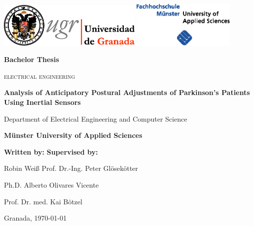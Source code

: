 \begin{titlepage}
\label{ch:titlepage}
\begin{center}

\includegraphics[width=7cm]{images/universidad_de_granada.eps}
	\hfill
\includegraphics[width=5cm]{images/fh-muenster.eps}
	\\ 

\vspace{3cm}

\Large\textbf{Bachelor Thesis}

\large\textsc{electrical engineering}

\vspace{1cm}

{\huge\textbf{Analysis of Anticipatory Postural Adjustments of Parkinson's Patients Using Inertial Sensors}}

\vspace{1cm}

Department of Electrical Engineering and Computer Science

\textbf{Münster University of Applied Sciences}

\end{center}

\vspace{1.5cm}

\textbf{Written by:}  \hfill \textbf{Supervised by:}

Robin Weiß \hfill Prof. Dr.-Ing. Peter Gl\"{o}sek\"{o}tter 

\hfill Ph.D. Alberto Olivares Vicente

\hfill Prof. Dr. med. Kai B\"{o}tzel

\vfill

Granada, \today

\end{titlepage}
